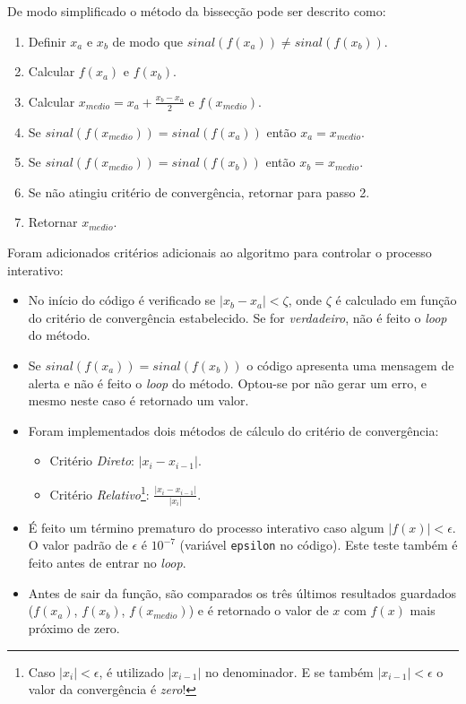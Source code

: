 \documentclass[final,3p,12pt]{elsarticle}
\begin{document}
    De modo simplificado o método da bissecção pode ser descrito como:
    
    \begin{enumerate}
        \item Definir $x_a$ e $x_b$ de modo que $sinal(f(x_a)) \neq sinal(f(x_b))$.
        \item Calcular $f(x_a)$ e $f(x_b)$.
        \item Calcular $x_{medio} = x_a + \frac{x_b - x_a}{2}$ e $f(x_{medio})$.
        \item Se $sinal(f(x_{medio})) = sinal(f(x_a))$ então $x_a = x_{medio}$.
        \item Se $sinal(f(x_{medio})) = sinal(f(x_b))$ então $x_b = x_{medio}$.
        \item Se não atingiu critério de convergência, retornar para passo 2.
        \item Retornar $x_{medio}$.
    \end{enumerate}
    
    Foram adicionados critérios adicionais ao algoritmo para controlar o processo interativo:

    \begin{itemize}
        \item No início do código é verificado se $|x_b - x_a| < \zeta$, onde $\zeta$ é calculado em função do critério de convergência estabelecido. Se for \emph{verdadeiro}, não é feito o \emph{loop} do método. 
        \item Se $sinal(f(x_a)) = sinal(f(x_b))$ o código apresenta uma mensagem de alerta e não é feito o \emph{loop} do método. Optou-se por não gerar um erro, e mesmo neste caso é retornado um valor.
        \item Foram implementados dois métodos de cálculo do critério de convergência:
        \begin{itemize}
            \item Critério \emph{Direto}: $|x_i - x_{i-1}|$.
            \item Critério \emph{Relativo}\footnote{Caso $|x_i| < \epsilon$, é utilizado $|x_{i-1}|$ no denominador. E se também $|x_{i-1}| < \epsilon$ o valor da convergência é \emph{zero}!}: $\frac{|x_i - x_{i-1}|}{|x_i|}$.
        \end{itemize}
        \item É feito um término prematuro do processo interativo caso algum $|f(x)| < \epsilon$. O valor padrão de $\epsilon$ é $10^{-7}$ (variável \verb|epsilon| no código). Este teste também é feito antes de entrar no \emph{loop}.
        \item Antes de sair da função, são comparados os três últimos resultados guardados ($f(x_a)$, $f(x_b)$, $f(x_{medio})$) e é retornado o valor de $x$ com $f(x)$ mais próximo de zero.
    \end{itemize}
\end{document}
